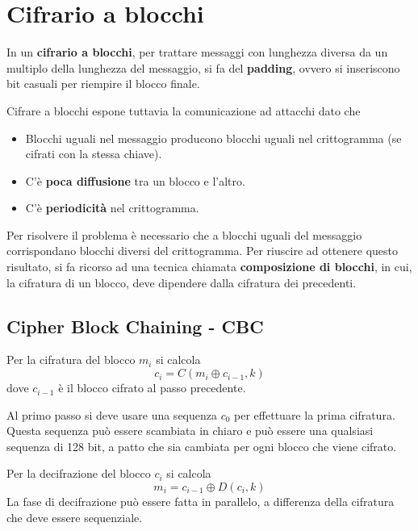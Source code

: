 \section{Cifrario a blocchi}
In un \textbf{cifrario a blocchi}, per trattare messaggi con lunghezza diversa da un multiplo della lunghezza del
messaggio, si fa del \textbf{padding}, ovvero si inseriscono bit casuali per riempire il blocco finale.

Cifrare a blocchi espone tuttavia la comunicazione ad attacchi dato che
\begin{itemize}
	\item Blocchi uguali nel messaggio producono blocchi uguali nel crittogramma (se cifrati con la stessa
	      chiave).
	\item C'\`e \textbf{poca diffusione} tra un blocco e l'altro.
	\item C'\`e \textbf{periodicit\`a} nel crittogramma.
\end{itemize}
Per risolvere il problema \`e necessario che a blocchi uguali del messaggio corrispondano blocchi diversi del
crittogramma. Per riuscire ad ottenere questo risultato, si fa ricorso ad una tecnica chiamata
\textbf{composizione di	blocchi}, in cui, la cifratura di un blocco, deve dipendere dalla cifratura dei precedenti.

\subsection{Cipher Block Chaining - CBC}
Per la cifratura del blocco $m_i$ si calcola
\[ c_i = C(m_i \oplus c_{i-1}, k) \]
dove $c_{i-1}$ \`e il blocco cifrato al passo precedente.

Al primo passo si deve usare una sequenza $c_0$ per effettuare la prima cifratura. Questa sequenza pu\`o essere
scambiata in chiaro e pu\`o essere una qualsiasi sequenza di 128 bit, a patto che sia cambiata per ogni blocco che
viene cifrato.

Per la decifrazione del blocco $c_i$ si calcola
\[ m_i = c_{i-1} \oplus D(c_i, k) \]
La fase di decifrazione pu\`o essere fatta in parallelo, a differenza della cifratura che deve essere sequenziale.